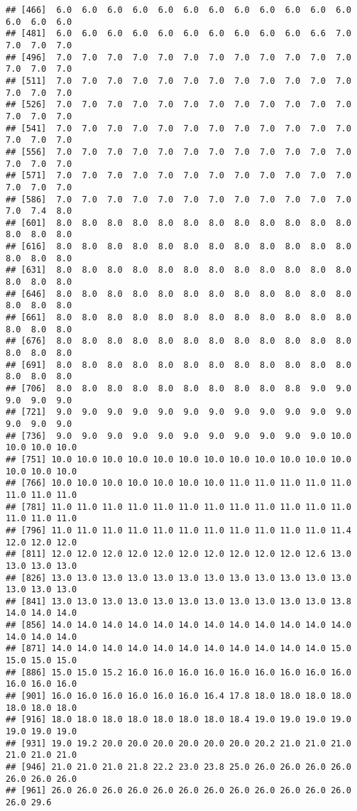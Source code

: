 \documentclass[
]{article}
\begin{document}
\begin{verbatim}
## [466]  6.0  6.0  6.0  6.0  6.0  6.0  6.0  6.0  6.0  6.0  6.0  6.0  6.0  6.0  6.0
## [481]  6.0  6.0  6.0  6.0  6.0  6.0  6.0  6.0  6.0  6.0  6.6  7.0  7.0  7.0  7.0
## [496]  7.0  7.0  7.0  7.0  7.0  7.0  7.0  7.0  7.0  7.0  7.0  7.0  7.0  7.0  7.0
## [511]  7.0  7.0  7.0  7.0  7.0  7.0  7.0  7.0  7.0  7.0  7.0  7.0  7.0  7.0  7.0
## [526]  7.0  7.0  7.0  7.0  7.0  7.0  7.0  7.0  7.0  7.0  7.0  7.0  7.0  7.0  7.0
## [541]  7.0  7.0  7.0  7.0  7.0  7.0  7.0  7.0  7.0  7.0  7.0  7.0  7.0  7.0  7.0
## [556]  7.0  7.0  7.0  7.0  7.0  7.0  7.0  7.0  7.0  7.0  7.0  7.0  7.0  7.0  7.0
## [571]  7.0  7.0  7.0  7.0  7.0  7.0  7.0  7.0  7.0  7.0  7.0  7.0  7.0  7.0  7.0
## [586]  7.0  7.0  7.0  7.0  7.0  7.0  7.0  7.0  7.0  7.0  7.0  7.0  7.0  7.4  8.0
## [601]  8.0  8.0  8.0  8.0  8.0  8.0  8.0  8.0  8.0  8.0  8.0  8.0  8.0  8.0  8.0
## [616]  8.0  8.0  8.0  8.0  8.0  8.0  8.0  8.0  8.0  8.0  8.0  8.0  8.0  8.0  8.0
## [631]  8.0  8.0  8.0  8.0  8.0  8.0  8.0  8.0  8.0  8.0  8.0  8.0  8.0  8.0  8.0
## [646]  8.0  8.0  8.0  8.0  8.0  8.0  8.0  8.0  8.0  8.0  8.0  8.0  8.0  8.0  8.0
## [661]  8.0  8.0  8.0  8.0  8.0  8.0  8.0  8.0  8.0  8.0  8.0  8.0  8.0  8.0  8.0
## [676]  8.0  8.0  8.0  8.0  8.0  8.0  8.0  8.0  8.0  8.0  8.0  8.0  8.0  8.0  8.0
## [691]  8.0  8.0  8.0  8.0  8.0  8.0  8.0  8.0  8.0  8.0  8.0  8.0  8.0  8.0  8.0
## [706]  8.0  8.0  8.0  8.0  8.0  8.0  8.0  8.0  8.0  8.8  9.0  9.0  9.0  9.0  9.0
## [721]  9.0  9.0  9.0  9.0  9.0  9.0  9.0  9.0  9.0  9.0  9.0  9.0  9.0  9.0  9.0
## [736]  9.0  9.0  9.0  9.0  9.0  9.0  9.0  9.0  9.0  9.0  9.0 10.0 10.0 10.0 10.0
## [751] 10.0 10.0 10.0 10.0 10.0 10.0 10.0 10.0 10.0 10.0 10.0 10.0 10.0 10.0 10.0
## [766] 10.0 10.0 10.0 10.0 10.0 10.0 10.0 11.0 11.0 11.0 11.0 11.0 11.0 11.0 11.0
## [781] 11.0 11.0 11.0 11.0 11.0 11.0 11.0 11.0 11.0 11.0 11.0 11.0 11.0 11.0 11.0
## [796] 11.0 11.0 11.0 11.0 11.0 11.0 11.0 11.0 11.0 11.0 11.0 11.4 12.0 12.0 12.0
## [811] 12.0 12.0 12.0 12.0 12.0 12.0 12.0 12.0 12.0 12.0 12.6 13.0 13.0 13.0 13.0
## [826] 13.0 13.0 13.0 13.0 13.0 13.0 13.0 13.0 13.0 13.0 13.0 13.0 13.0 13.0 13.0
## [841] 13.0 13.0 13.0 13.0 13.0 13.0 13.0 13.0 13.0 13.0 13.0 13.8 14.0 14.0 14.0
## [856] 14.0 14.0 14.0 14.0 14.0 14.0 14.0 14.0 14.0 14.0 14.0 14.0 14.0 14.0 14.0
## [871] 14.0 14.0 14.0 14.0 14.0 14.0 14.0 14.0 14.0 14.0 14.0 15.0 15.0 15.0 15.0
## [886] 15.0 15.0 15.2 16.0 16.0 16.0 16.0 16.0 16.0 16.0 16.0 16.0 16.0 16.0 16.0
## [901] 16.0 16.0 16.0 16.0 16.0 16.0 16.4 17.8 18.0 18.0 18.0 18.0 18.0 18.0 18.0
## [916] 18.0 18.0 18.0 18.0 18.0 18.0 18.0 18.4 19.0 19.0 19.0 19.0 19.0 19.0 19.0
## [931] 19.0 19.2 20.0 20.0 20.0 20.0 20.0 20.0 20.2 21.0 21.0 21.0 21.0 21.0 21.0
## [946] 21.0 21.0 21.0 21.8 22.2 23.0 23.8 25.0 26.0 26.0 26.0 26.0 26.0 26.0 26.0
## [961] 26.0 26.0 26.0 26.0 26.0 26.0 26.0 26.0 26.0 26.0 26.0 26.0 26.0 29.6
\end{verbatim}
\end{document}
